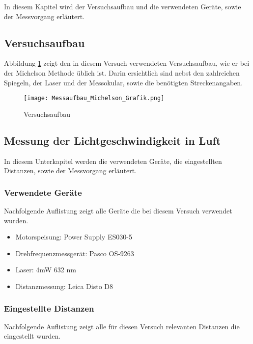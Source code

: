 In diesem Kapitel wird der Versuchsaufbau und die verwendeten Geräte, sowie der Messvorgang erläutert.

\subsection{Versuchsaufbau}

Abbildung \ref{fig:Versuchaufbau} zeigt den in diesem Versuch verwendeten Versuchsaufbau, wie er bei der Michelson Methode üblich ist. Darin ersichtlich sind nebst den zahlreichen Spiegeln, der Laser und der Messokular, sowie die benötigten Streckenangaben.

\begin{figure}[htb]
\texttt{[image: Messaufbau\_Michelson\_Grafik.png]}
\caption{Versuchsaufbau}
\label{fig:Versuchaufbau}
\end{figure}

\subsection{Messung der Lichtgeschwindigkeit in Luft}

In diesem Unterkapitel werden die verwendeten Geräte, die eingestellten Distanzen, sowie der Messvorgang erläutert.

\subsubsection{Verwendete Geräte}

Nachfolgende Auflistung zeigt alle Geräte die bei diesem Versuch verwendet wurden.

\begin{itemize}
\item Motorspeisung: Power Supply ES030-5
\item Drehfrequenzmessgerät: Pasco OS-9263
\item Laser: 4mW 632 nm
\item Distanzmessung: Leica Disto D8
\end{itemize}

\subsubsection{Eingestellte Distanzen}

Nachfolgende Auflistung zeigt alle für diesen Versuch relevanten Distanzen die eingestellt wurden.

